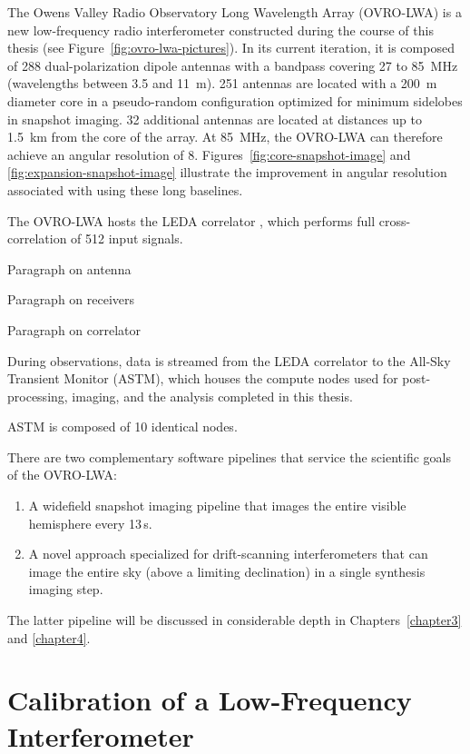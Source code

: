 \begin{bibunit}
The Owens Valley Radio Observatory Long Wavelength Array (OVRO-LWA) is a new low-frequency radio
interferometer constructed during the course of this thesis (see
Figure~\ref{fig:ovro-lwa-pictures}). In its current iteration, it is composed of 288
dual-polarization dipole antennas with a bandpass covering 27 to 85~MHz (wavelengths between 3.5 and
11~m). 251 antennas are located with a 200~m diameter core in a pseudo-random configuration
optimized for minimum sidelobes in snapshot imaging. 32 additional antennas are located at distances
up to 1.5~km from the core of the array. At 85~MHz, the OVRO-LWA can therefore achieve an angular
resolution of 8\arcmin. Figures~\ref{fig:core-snapshot-image} and \ref{fig:expansion-snapshot-image}
illustrate the improvement in angular resolution associated with using these long baselines.

The OVRO-LWA hosts the LEDA correlator \citep{2015JAI.....450003K}, which performs full
cross-correlation of 512 input signals.

Paragraph on antenna

Paragraph on receivers

Paragraph on correlator


During observations, data is streamed from the LEDA correlator to the All-Sky Transient Monitor
(ASTM), which houses the compute nodes used for post-processing, imaging, and the analysis completed
in this thesis.

ASTM is composed of 10 identical nodes.


There are two complementary software pipelines that service the scientific goals of the OVRO-LWA:
\begin{enumerate}
    \item A widefield snapshot imaging pipeline that images the entire visible hemisphere every
        13\,s.
    \item A novel approach specialized for drift-scanning interferometers that can image the entire
        sky (above a limiting declination) in a single synthesis imaging step.
\end{enumerate}
The latter pipeline will be discussed in considerable depth in Chapters~\ref{chapter3} and
\ref{chapter4}.

\section{Calibration of a Low-Frequency Interferometer}


\end{bibunit}
